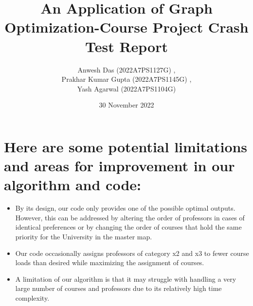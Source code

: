 \documentclass[12pt, letterpaper]{article}
\title{An Application of Graph Optimization-Course Project Crash Test Report}
\author{Anwesh Das (2022A7PS1127G) , \\Prakhar Kumar Gupta (2022A7PS1145G) ,\\ Yash Agarwal (2022A7PS1104G)}
\date{30 November 2022}
\begin{document}
\maketitle
\section{Here are some potential limitations and areas for improvement in our algorithm and code:}
\begin{itemize}
\item By its design, our code only provides one of the possible optimal outputs. However, this can be addressed by altering the order of professors in cases of identical preferences or by changing the order of courses that hold the same priority for the University in the master map.
\item Our code occasionally assigns professors of category x2 and x3 to fewer course loads than desired while maximizing the assignment of courses.
\item A limitation of our algorithm is that it may struggle with handling a very large number of courses and professors due to its relatively high time complexity.
\end{itemize}
\end{document}
